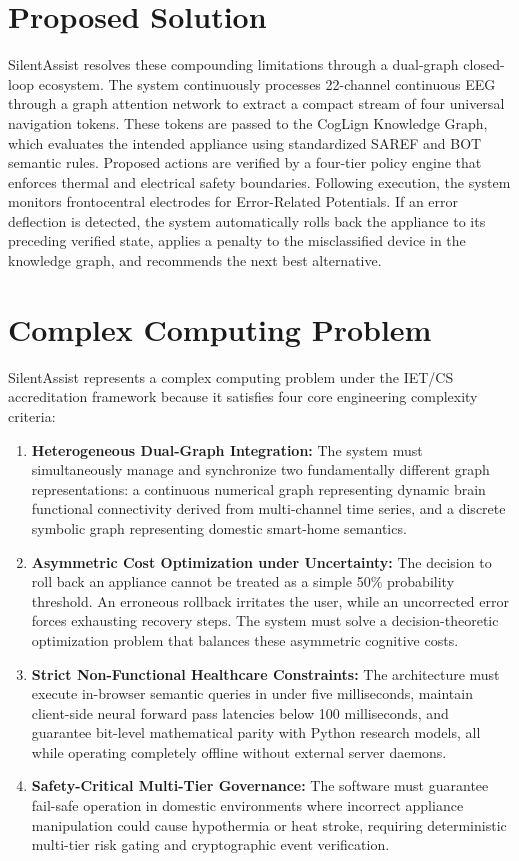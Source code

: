 \documentclass[12pt,a4paper]{report}
\begin{document}
\section{Proposed Solution}
SilentAssist resolves these compounding limitations through a dual-graph closed-loop ecosystem. The system continuously processes 22-channel continuous EEG through a graph attention network to extract a compact stream of four universal navigation tokens. These tokens are passed to the CogLign Knowledge Graph, which evaluates the intended appliance using standardized SAREF and BOT semantic rules. Proposed actions are verified by a four-tier policy engine that enforces thermal and electrical safety boundaries. Following execution, the system monitors frontocentral electrodes for Error-Related Potentials. If an error deflection is detected, the system automatically rolls back the appliance to its preceding verified state, applies a penalty to the misclassified device in the knowledge graph, and recommends the next best alternative.

\section{Complex Computing Problem}
SilentAssist represents a complex computing problem under the IET/CS accreditation framework because it satisfies four core engineering complexity criteria:
\begin{enumerate}[leftmargin=1.5em]
    \item \textbf{Heterogeneous Dual-Graph Integration:} The system must simultaneously manage and synchronize two fundamentally different graph representations: a continuous numerical graph representing dynamic brain functional connectivity derived from multi-channel time series, and a discrete symbolic graph representing domestic smart-home semantics.
    \item \textbf{Asymmetric Cost Optimization under Uncertainty:} The decision to roll back an appliance cannot be treated as a simple 50\% probability threshold. An erroneous rollback irritates the user, while an uncorrected error forces exhausting recovery steps. The system must solve a decision-theoretic optimization problem that balances these asymmetric cognitive costs.
    \item \textbf{Strict Non-Functional Healthcare Constraints:} The architecture must execute in-browser semantic queries in under five milliseconds, maintain client-side neural forward pass latencies below 100 milliseconds, and guarantee bit-level mathematical parity with Python research models, all while operating completely offline without external server daemons.
    \item \textbf{Safety-Critical Multi-Tier Governance:} The software must guarantee fail-safe operation in domestic environments where incorrect appliance manipulation could cause hypothermia or heat stroke, requiring deterministic multi-tier risk gating and cryptographic event verification.
\end{enumerate}
\end{document}
